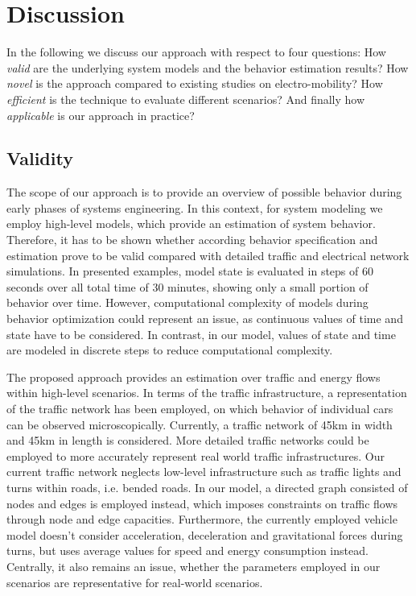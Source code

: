 \section{Discussion}
\label{section:discussion}

In the following we discuss our approach with respect to four questions: How \textit{valid} are the underlying system models and the behavior estimation results? How \textit{novel} is the approach compared to existing studies on electro-mobility? How \textit{efficient} is the technique to evaluate different scenarios? And finally how \textit{applicable} is our approach in practice?

\subsection{Validity}

The scope of our approach is to provide an overview of possible behavior during early phases of systems engineering. In this context, for system modeling we employ high-level models, which provide an estimation of system behavior. Therefore, it has to be shown whether according behavior specification and estimation prove to be valid compared with detailed traffic and electrical network simulations. In presented examples, model state is evaluated in steps of 60 seconds over all total time of 30 minutes, showing only a small portion of behavior over time. However, computational complexity of models during behavior optimization could represent an issue, as continuous values of time and state have to be considered. In contrast, in our model, values of state and time are modeled in discrete steps to reduce computational complexity.

The proposed approach provides an estimation over traffic and energy flows within high-level scenarios. In terms of the traffic infrastructure, a representation of the traffic network has been employed, on which behavior of individual cars can be observed microscopically. Currently, a traffic network of 45km in width and 45km in length is considered. More detailed traffic networks could be employed to more accurately represent real world traffic infrastructures. Our current traffic network neglects low-level infrastructure such as traffic lights and turns within roads, i.e. bended roads. In our model, a directed graph consisted of nodes and edges is employed instead, which imposes constraints on traffic flows through node and edge capacities. Furthermore, the currently employed vehicle model doesn't consider acceleration, deceleration and gravitational forces during turns, but uses average values for speed and energy consumption instead. Centrally, it also remains an issue, whether the parameters employed in our scenarios are representative for real-world scenarios.


